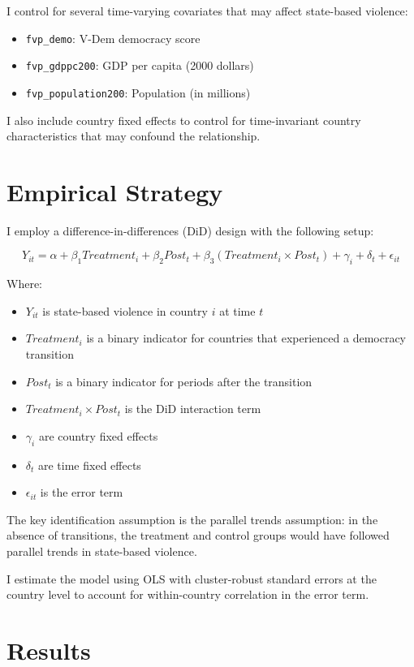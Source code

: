 \documentclass[12pt]{article}
\begin{document}
I control for several time-varying covariates that may affect state-based violence:
\begin{itemize}
    \item \texttt{fvp\_demo}: V-Dem democracy score
    \item \texttt{fvp\_gdppc200}: GDP per capita (2000 dollars)
    \item \texttt{fvp\_population200}: Population (in millions)
\end{itemize}

I also include country fixed effects to control for time-invariant country characteristics that may confound the relationship.

\section{Empirical Strategy}

I employ a difference-in-differences (DiD) design with the following setup:

$$Y_{it} = \alpha + \beta_1 Treatment_i + \beta_2 Post_t + \beta_3 (Treatment_i \times Post_t) + \gamma_i + \delta_t + \epsilon_{it}$$

Where:
\begin{itemize}
    \item $Y_{it}$ is state-based violence in country $i$ at time $t$
    \item $Treatment_i$ is a binary indicator for countries that experienced a democracy transition
    \item $Post_t$ is a binary indicator for periods after the transition
    \item $Treatment_i \times Post_t$ is the DiD interaction term
    \item $\gamma_i$ are country fixed effects
    \item $\delta_t$ are time fixed effects
    \item $\epsilon_{it}$ is the error term
\end{itemize}

The key identification assumption is the parallel trends assumption: in the absence of transitions, the treatment and control groups would have followed parallel trends in state-based violence.

I estimate the model using OLS with cluster-robust standard errors at the country level to account for within-country correlation in the error term.

\section{Results}
\end{document}
